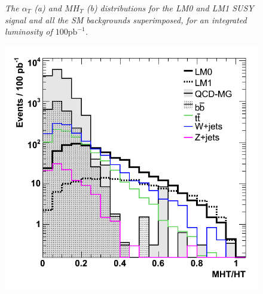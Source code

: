 \begin{figure}[h!]
\begin{minipage}[b]{0.5\linewidth}
\end{minipage}
\caption{\textit{The $\alpha_{T}$ (a) and $MH_{T}$ (b) distributions for the LM0 and LM1 SUSY signal and all the SM backgrounds superimposed, for an integrated luminosity of $100 \textrm{pb}^{-1}$.} }
\label{fig:dists1}
\end{figure}
\begin{figure}[h!]
\begin{minipage}[b]{0.5\linewidth}
\centering
{\label{fig:mhtovht}\includegraphics[scale=0.38]{./plots/MHTovHT-AllSignals.png}} 
\end{minipage}
\begin{minipage}[b]{0.5\linewidth}
\centering

\end{minipage}
\end{figure}
